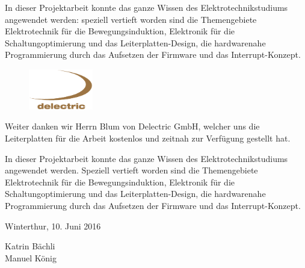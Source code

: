 In dieser Projektarbeit konnte das ganze Wissen des Elektrotechnikstudiums angewendet werden: speziell vertieft worden sind die Themengebiete Elektrotechnik für die Bewegungsinduktion, Elektronik für die Schaltungoptimierung und das Leiterplatten-Design, die hardwarenahe Programmierung durch das Aufsetzen der Firmware und das Interrupt-Konzept. 

\begin{figure}[ht]
   \includegraphics[width=0.25\textwidth]{0Vorspann/imag/delectric_logo_gross.png}
   \label{delectric_logo} 
\end{figure}

Weiter danken wir Herrn Blum von Delectric GmbH, welcher uns die Leiterplatten für die Arbeit kostenlos und zeitnah zur Verfügung gestellt hat.

In dieser Projektarbeit konnte das ganze Wissen des Elektrotechnikstudiums angewendet werden. Speziell vertieft worden sind die Themengebiete Elektrotechnik für die Bewegungsinduktion, Elektronik für die Schaltungoptimierung und das Leiterplatten-Design, die hardwarenahe Programmierung durch das Aufsetzen der Firmware und das Interrupt-Konzept. 


Winterthur, 10. Juni 2016


Katrin Bächli\\
Manuel König





